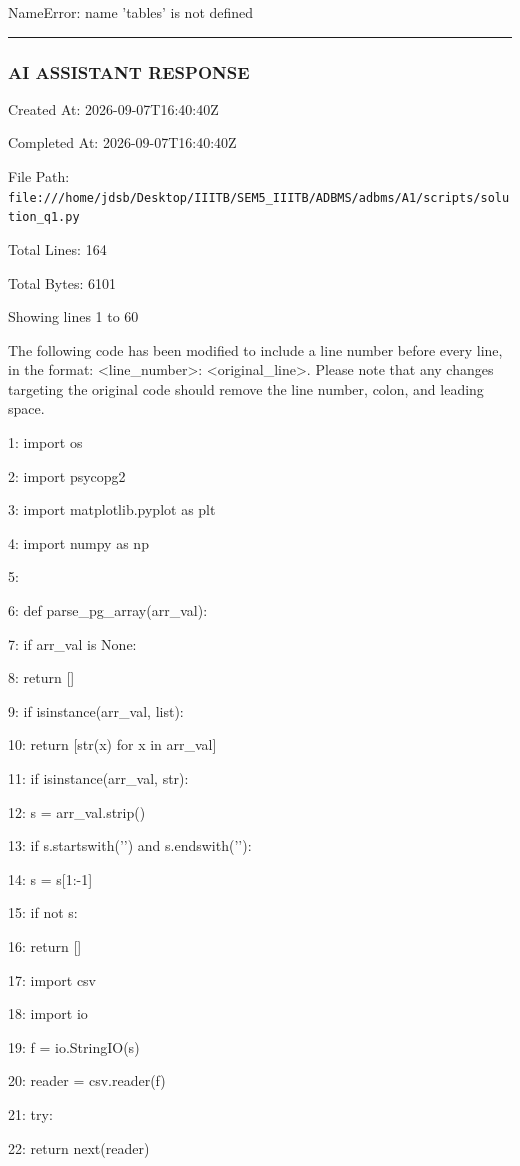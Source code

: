\documentclass[11pt,a4paper]{article}
\begin{document}
NameError: name 'tables' is not defined


\hrule

\subsubsection{AI ASSISTANT RESPONSE}

Created At: 2026-09-07T16:40:40Z

Completed At: 2026-09-07T16:40:40Z

File Path: \texttt{file:///home/jdsb/Desktop/IIITB/SEM5\_IIITB/ADBMS/adbms/A1/scripts/solution\_q1.py}

Total Lines: 164

Total Bytes: 6101

Showing lines 1 to 60

The following code has been modified to include a line number before every line, in the format: <line\_number>: <original\_line>. Please note that any changes targeting the original code should remove the line number, colon, and leading space.

1: import os

2: import psycopg2

3: import matplotlib.pyplot as plt

4: import numpy as np

5:

6: def parse\_pg\_array(arr\_val):

7:     if arr\_val is None:

8:         return []

9:     if isinstance(arr\_val, list):

10:         return [str(x) for x in arr\_val]

11:     if isinstance(arr\_val, str):

12:         s = arr\_val.strip()

13:         if s.startswith('{') and s.endswith('}'):

14:             s = s[1:-1]

15:         if not s:

16:             return []

17:         import csv

18:         import io

19:         f = io.StringIO(s)

20:         reader = csv.reader(f)

21:         try:

22:             return next(reader)
\end{document}
